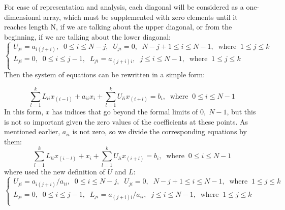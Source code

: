\documentclass{article}
\begin{document}
For ease of representation and analysis, each diagonal will be considered as a one-dimensional array, which must be supplemented with zero elements until it reaches length N, if we are talking about the upper diagonal, or from the beginning, if we are talking about the lower diagonal:
\begin{equation}
\begin{cases}
    U_{ji} = a_{i (j + i)}, \;\; 0 \leq i \leq N - j, \;\; U_{ji} = 0, \;\; N - j + 1 \leq i \leq N-1, \;\;\text{where} \;\; 1 \leq j \leq k  \\
    L_{ji} = 0, \;\; 0 \leq i \leq j - 1, \;\; L_{ji} = a_{(j + i) i}, \;\; j \leq i \leq N - 1, \;\;\text{where} \;\; 1 \leq j \leq k  \\
\end{cases}
\end{equation}
Then the system of equations can be rewritten in a simple form:

\begin{equation}
    \sum_{l = 1}^{k} L_{li} x_{(i-l)} + a_{ii} x_{i} + \sum_{l = 1}^{k} U_{li} x_{(i+l)} = b_i, \;\;\text{where} \;\; 0 \leq i \leq N-1
\end{equation}
In this form, $x$ has indices that go beyond the formal limits of $0,\; N-1$, but this is not so important given the zero values of the coefficients at these points. As mentioned earlier, $a_{ii}$ is not zero, so we divide the corresponding equations by them:
\begin{equation}\label{4}
    \sum_{l = 1}^{k} L_{li} x_{(i-l)}  + x_{i} + \sum_{l = 1}^{k} U_{li} x_{(i+l)} = b_i, \;\;\text{where} \;\; 0 \leq i \leq N-1
\end{equation}
where used the new definition of $U$ and $L$:
\begin{equation}
\begin{cases}
    U_{ji} = a_{i (j + i)} / a_{ii}, \;\; 0 \leq i \leq N - j, \;\; U_{ji} = 0, \;\; N - j + 1 \leq i \leq N-1, \;\;\text{where} \;\; 1 \leq j \leq k  \\
    L_{ji} = 0, \;\; 0 \leq i \leq j - 1, \;\; L_{ji} = a_{(j + i) i} / a_{ii}, \;\; j \leq i \leq N - 1, \;\;\text{where} \;\; 1 \leq j \leq k  \\
\end{cases}
\end{equation}
\end{document}
